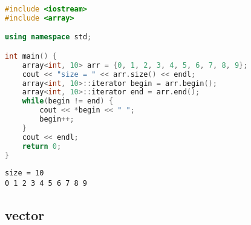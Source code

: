 \begin{table}[H]
	\centering
	\caption{array成员函数}
\end{table}


\begin{lstlisting}[language=C++]
#include <iostream>
#include <array>

using namespace std;

int main() {
    array<int, 10> arr = {0, 1, 2, 3, 4, 5, 6, 7, 8, 9};
    cout << "size = " << arr.size() << endl;
    array<int, 10>::iterator begin = arr.begin();
    array<int, 10>::iterator end = arr.end();
    while(begin != end) {
        cout << *begin << " ";
        begin++;
    }
    cout << endl;
    return 0;
}
\end{lstlisting}

\begin{tcolorbox}
	\begin{verbatim}
size = 10
0 1 2 3 4 5 6 7 8 9
	\end{verbatim}
\end{tcolorbox}

\subsection{vector}

